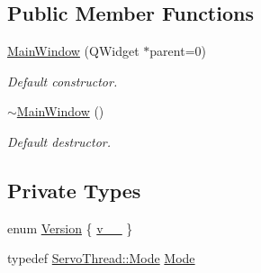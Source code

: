 \subsection*{Public Member Functions}
\begin{DoxyCompactItemize}
\item 
\hyperlink{a00005_a8b244be8b7b7db1b08de2a2acb9409db}{Main\+Window} (Q\+Widget $\ast$parent=0)
\begin{DoxyCompactList}\small\item\em Default constructor. \end{DoxyCompactList}\item 
\hyperlink{a00005_ae98d00a93bc118200eeef9f9bba1dba7}{$\sim$\+Main\+Window} ()
\begin{DoxyCompactList}\small\item\em Default destructor. \end{DoxyCompactList}\end{DoxyCompactItemize}
\subsection*{Private Types}
\begin{DoxyCompactItemize}
\item 
enum \hyperlink{a00005_a355d9f17965e5105226409313743cb9d}{Version} \{ \hyperlink{a00005_a355d9f17965e5105226409313743cb9daac0c8ddcec40274ec60fb95f59ba7aba}{v\+\_\+\_}
 \}
\item 
typedef \hyperlink{a00009_a8d581034e60792a9995d44065f6140a5}{Servo\+Thread\+::\+Mode} \hyperlink{a00005_a372482d77430e41c5483ab8605eece9d}{Mode}
\end{DoxyCompactItemize}
